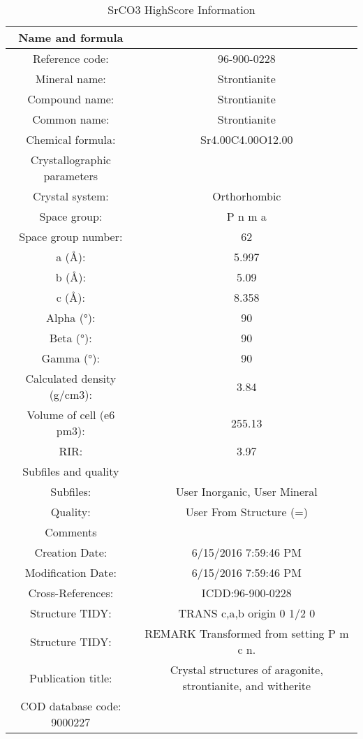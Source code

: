 \documentclass[11pt]{article}
\begin{document}
	\begin{table}[htbp]
		\centering
		\caption{SrCO3 HighScore Information}
		\begin{tabular}{cc}
			\toprule
			Name and formula &  \\
			\midrule
			Reference code: & 96-900-0228 \\
			Mineral name: & Strontianite \\
			Compound name: & Strontianite \\
			Common name: & Strontianite \\
			Chemical formula: & Sr4.00C4.00O12.00 \\
			\midrule
			Crystallographic parameters &  \\
			\midrule
			Crystal system: & Orthorhombic \\
			Space group: & P n m a \\
			Space group number: & 62 \\
			a (Å): & 5.997 \\
			b (Å): & 5.09 \\
			c (Å): & 8.358 \\
			Alpha (°): & 90 \\
			Beta (°): & 90 \\
			Gamma (°): & 90 \\
			Calculated density (g/cm3): & 3.84 \\
			Volume of cell (e6 pm3): & 255.13 \\
			RIR: & 3.97 \\
			\midrule
			Subfiles and quality &  \\
			\midrule
			Subfiles: & User Inorganic, User Mineral \\
			Quality: & User From Structure (=) \\
			Comments &  \\
			Creation Date: & 6/15/2016 7:59:46 PM \\
			Modification Date: & 6/15/2016 7:59:46 PM \\
			Cross-References: & ICDD:96-900-0228 \\
			Structure TIDY: & TRANS  c,a,b     origin  0 1/2 0 \\
			Structure TIDY: & REMARK Transformed from setting  P m c n. \\
			Publication title: & Crystal structures of aragonite, strontianite, and witherite \\
			COD database code: 9000227 &  \\
			\bottomrule

\end{tabular}
\end{table}
\end{document}
